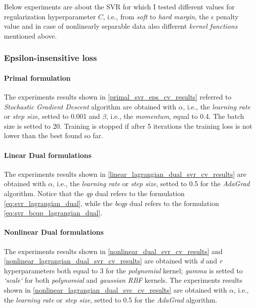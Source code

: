 Below experiments are about the SVR for which I tested different values for regularization hyperparameter $C$, i.e., from \emph{soft} to \emph{hard margin}, the $\epsilon$ penalty value and in case of nonlinearly separable data also different \emph{kernel functions} mentioned above.

\subsubsection{Epsilon-insensitive loss}

\paragraph{Primal formulation}

The experiments results shown in \ref{primal_svr_eps_cv_results} referred to \emph{Stochastic Gradient Descent} algorithm are obtained with $\alpha$, i.e., the \emph{learning rate} or \emph{step size}, setted to 0.001 and $\beta$, i.e., the \emph{momentum}, equal to 0.4. The batch size is setted to 20. Training is stopped if after 5 iterations the training loss is not lower than the best found so far.





\paragraph{Linear Dual formulations}

The experiments results shown in \ref{linear_lagrangian_dual_svr_cv_results} are obtained with $\alpha$, i.e., the \emph{learning rate} or \emph{step size}, setted to 0.5 for the \emph{AdaGrad} algorithm. Notice that the \emph{qp} dual refers to the formulation \eqref{eq:svr_lagrangian_dual}, while the \emph{bcqp} dual refers to the formulation \eqref{eq:svr_bcqp_lagrangian_dual}.





\paragraph{Nonlinear Dual formulations}

The experiments results shown in \ref{nonlinear_dual_svr_cv_results} and \ref{nonlinear_lagrangian_dual_svr_cv_results} are obtained with \emph{d} and \emph{r} hyperparameters both equal to 3 for the \emph{polynomial} kernel; \emph{gamma} is setted to \emph{`scale`} for both \emph{polynomial} and \emph{gaussian RBF} kernels. The experiments results shown in \ref{nonlinear_lagrangian_dual_svc_cv_results} are obtained with $\alpha$, i.e., the \emph{learning rate} or \emph{step size}, setted to 0.5 for the \emph{AdaGrad} algorithm.

